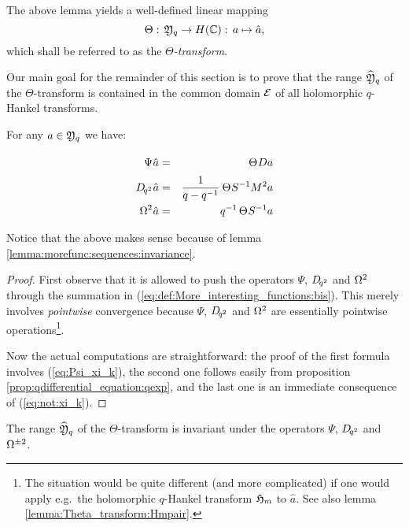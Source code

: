 \begin{defn}
The above lemma yields a well-defined linear mapping
$$ \Theta : \, {\mathfrak Y}_q \rightarrow H(\mathbb{C}) : \, a \mapsto \hat{a}, $$
which shall be referred to as the {\em $\Theta$-transform}\@.
\end{defn}

Our main goal for the remainder of this section is to prove that the range
$\widehat{\mathfrak Y}_q$ of the $\Theta$-transform is contained in the common domain $\mathcal E$
of all holomorphic $q$-Hankel transforms.

\begin{lemma} \label{lemma:sequence_operations:commutation}
For any\/ $a\in{\mathfrak Y}_q$ we have:
\begin{eqnarray*}
\Psi  \vssp \hat{a}      &=&    \Theta \vssp D a
\vertXL\\
\Dqsqr  \vssp \hat{a}    &=&    \frac{1}{q - q^{-1}} \: \Theta \vssp S^{-1} M^2 a
\vertXL\\
\Om^2 \vssp  \hat{a}     &=&    q^{-1} \, \Theta \vssp S^{-1} a
\end{eqnarray*}
\end{lemma}
Notice that the above makes sense because of lemma \ref{lemma:morefunc:sequences:invariance}\@.
\vspace{1ex}

\begin{proof}
First observe that it is allowed to push the operators $\Psi$, $D_{\!q^2}$ and $\Omega^2$
through the summation in (\ref{eq:def:More_interesting_functions:bis}).
This merely involves {\em pointwise\/} convergence because
$\Psi$, $D_{\!q^2}$ and $\Omega^2$ are essentially pointwise
operations\footnote{The situation would be quite different (and more complicated)
if one would apply e.g.\ the holomorphic $q$-Hankel transform $\mathfrak{H}_{m}$ to $\hat{a}$.
See also lemma \ref{lemma:Theta_transform:Hmpair}.}\@.

Now the actual computations are straightforward:
the proof of the first formula involves (\ref{eq:Psi_xi_k}),
the second one follows easily from proposition \ref{prop:qdifferential_equation:qexp},
and the last one is an immediate consequence of (\ref{eq:not:xi_k}).
\end{proof}



\begin{cor} \label{cor:sequence_operations:commutation}
The range\/ $\widehat{\mathfrak Y}_q$ of the\/ $\Theta$-transform is invariant under the
operators\/ $\Psi$, $D_{\!q^2}$ and\/ $\Omega^{\pm 2}$.
\end{cor}



